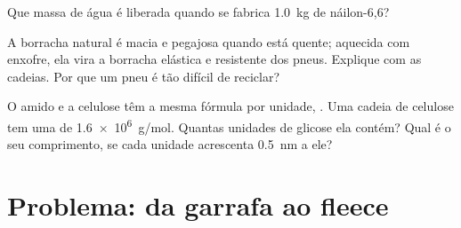 \begin{exercise}[$\star\star\star$]\label{exo:g12:polymers:13}
Que massa de água é liberada quando se fabrica \qty{1.0}{kg} de
náilon-6,6?
\end{exercise}

\begin{exercise}[$\star\star\star$]\label{exo:g12:polymers:14}
A borracha natural é macia e pegajosa quando está quente; aquecida com
enxofre, ela vira a borracha elástica e resistente dos pneus. Explique
com as cadeias. Por que um pneu é tão difícil de reciclar?
\end{exercise}

\begin{exercise}[$\star\star\star$]\label{exo:g12:polymers:15}
O amido e a celulose têm a mesma fórmula por unidade, . Uma
cadeia de celulose tem uma  de \qty{1.6e6}{g/mol}. Quantas
unidades de glicose ela contém? Qual é o seu comprimento, se cada
unidade acrescenta \qty{0.5}{nm} a ele?
\end{exercise}

\section{Problema: da garrafa ao fleece}

